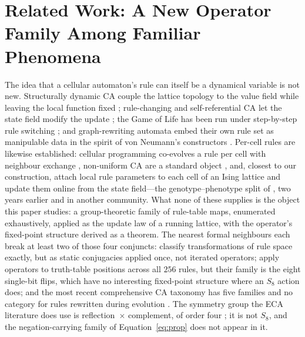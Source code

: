 \documentclass[man,12pt,floatsintext,donotrepeattitle]{apa7}
\newcommand{\secref}[1]{\emph{\nameref{#1}}}
\begin{document}
\clearpage
\section{Related Work: A New Operator Family Among Familiar Phenomena}
\label{sec:related}

The idea that a cellular automaton's rule can itself be a dynamical variable
is not new. Structurally dynamic CA couple the lattice topology to the value
field while leaving the local function fixed \parencite{ilachinski1987structurally};
rule-changing and self-referential CA let the state field modify the update
\parencite{mori1998rulechanging,pavlic2014selfref}; the Game of Life has been
run under step-by-step rule switching \parencite{miszczak2023ruleswitching};
and graph-rewriting automata embed their own rule set as manipulable data in
the spirit of von Neumann's constructors \parencite{tomita2007selfdescription}.
Per-cell rules are likewise established: cellular programming co-evolves a
rule per cell with neighbour exchange \parencite{sipper1996coevolving}, non-uniform
CA are a standard object \parencite{dennunzio2011nonuniform}, and, closest to our
construction, \textcite{khajehabdollahi2023locally} attach local rule
parameters to each cell of an Ising lattice and update them online from the
state field---the genotype--phenotype split of \secref{sec:object}, two years
earlier and in another community. What none of these supplies is the object
this paper studies: a group-theoretic family of rule-table maps, enumerated
exhaustively, applied as the update law of a running lattice, with the
operator's fixed-point structure derived as a theorem. The nearest formal
neighbours each break at least two of those four conjuncts:
\textcite{cattaneo1997transformations} classify transformations of rule
space exactly, but as static conjugacies applied once, not iterated
operators; \textcite{lipackard1990structure} apply operators to truth-table
positions across all $256$ rules, but their family is the eight single-bit
flips, which have no interesting fixed-point structure where an $S_8$ action
does; and the most recent comprehensive CA taxonomy has five families and no
category for rules rewritten during evolution \parencite{rollier2024taxonomy}.
The symmetry group the ECA literature does use is reflection~$\times$
complement, of order four \parencite{svozil2025symmetries}; it is not $S_8$,
and the negation-carrying family of Equation~\eqref{eq:prop} does not appear
in it.
\end{document}
